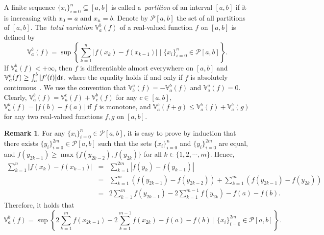 \documentclass[12pt]{article}
\theoremstyle{plain}
\theoremstyle{definition}
\newtheorem{remk}[thrm]{Remark}
\begin{document}
A finite sequence $\{x_i\}_{i=0}^n\subseteq[a, b]$ is called a~\emph{partition} of an interval $[a, b]$ if it is increasing with $x_0=a$ and $x_n=b$. Denote by $\mathcal P[a, b]$ the set of all partitions of $[a, b]$. The~\emph{total variation} $\mathbb{V}_a^b(f)$ of a real-valued function $f$ on $[a, b]$ is defined by
\[
\mathbb{V}_a^b(f)=\sup\left\{\sum_{k=1}^{n}|f(x_k)-f(x_{k-1})|\mid \{x_i\}_{i=0}^n\in\mathcal P[a, b]\right\}.
\]
 If $\mathbb{V}_a^b(f)<+\infty$, then $f$ is differentiable almost everywhere on $[a, b]$ and $\mathbb{V}_a^b(f)\geq\int_a^b|f^\prime(t)|{\rm d}t$, where the equality holds if and only if $f$ is absolutely continuous~\cite{RF10}.
We use the convention that $\mathbb{V}_b^a(f)=-\mathbb{V}_a^b(f)$ and $\mathbb{V}_a^a(f)=0$. Clearly, $\mathbb{V}_a^b(f)=\mathbb{V}_a^c(f)+\mathbb{V}_c^b(f)$ for any $c\in [a, b]$, $\mathbb{V}_a^b(f)=|f(b)-f(a)|$ if $f$ is monotone,
and $\mathbb{V}_a^b(f+g)\leq \mathbb{V}_a^b(f)+\mathbb{V}_a^b(g)$ for any two real-valued functions $f, g$ on $[a, b]$.

\begin{remk}\label{remk-variation}
For any $\{x_i\}_{i=0}^n\in\mathcal P[a, b]$, it is easy to prove by induction that there exists $\{y_i\}_{i=0}^{2m}\in\mathcal P[a, b]$ such that the sets $\{x_i\}_{i=0}^n$ and $\{y_i\}_{i=0}^{2m}$ are equal, and $f(y_{2k-1})\geq\max\{f(y_{2k-2}), f(y_{2k})\}$ for all $k\in\{1, 2, \cdots, m\}$. Hence,
\begin{eqnarray*}
  \sum_{k=1}^{n}|f(x_k)-f(x_{k-1})|
 &=& \sum_{k=1}^{2m}|f(y_k)-f(y_{k-1})| \\
 &=& \sum_{k=1}^{m}(f(y_{2k-1})-f(y_{2k-2}))+\sum_{k=1}^{m}(f(y_{2k-1})-f(y_{2k})) \\
 &=& 2\sum_{k=1}^{m}f(y_{2k-1})-2\sum_{k=1}^{m-1}f(y_{2k})-f(a)-f(b).
\end{eqnarray*}
Therefore, it holds that
\[
\mathbb{V}_a^b(f)=\sup\left\{2\sum_{k=1}^{m}f(x_{2k-1})-2\sum_{k=1}^{m-1}f(x_{2k})-f(a)-f(b)\mid \{x_i\}_{i=0}^{2m}\in\mathcal P[a, b]\right\}.
\]
\end{remk}
\end{document}
